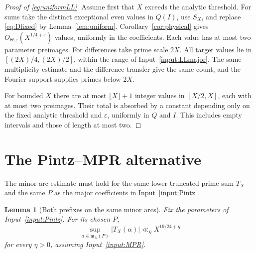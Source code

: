 \documentclass[11pt]{article}
\newtheorem{lemma}[theorem]{Lemma}
\theoremstyle{definition}
\theoremstyle{remark}
\numberwithin{equation}{section}
\newcommand{\eps}{\varepsilon}
\newcommand{\m}{\mathfrak m}
\begin{document}
\begin{proof}[Proof of \eqref{eq:uniformLL}]
Assume first that $X$ exceeds the analytic threshold. For sums take
the distinct exceptional even values in $Q(I)$, use $S_X$, and replace
\eqref{eq:Dfixed} by Lemma~\ref{lem:uniform}. Corollary~\ref{cor:physical}
gives $O_{\Theta,\eps}(X^{1/4+\eps})$ values, uniformly in the
coefficients. Each value has at most two parameter preimages.
For differences take prime scale $2X$. All target values lie in
$[(2X)/4,(2X)/2]$, within the range of Input~\ref{input:LLmajor}.
The same multiplicity estimate and the difference transfer give
the same count, and the Fourier support supplies primes below $2X$.

For bounded $X$ there are at most $\lfloor X\rfloor+1$ integer values
in $[X/2,X]$, each with at most two preimages. Their total is absorbed
by a constant depending only on the fixed analytic threshold and
$\eps$, uniformly in $Q$ and $I$. This includes empty intervals and
those of length at most two.
\end{proof}

\section{The Pintz--MPR alternative}\label{sec:fallbackproof}

The minor-arc estimate must hold for the same lower-truncated prime
sum $T_X$ and the same $P$ as the major coefficients in
Input~\ref{input:Pintz}.

\begin{lemma}[Both prefixes on the same minor arcs]\label{lem:compatible}
Fix the parameters of Input~\ref{input:Pintz}. For its chosen $P$,
\begin{equation}\label{eq:MPRminor}
               \sup_{\alpha\in\m_X(P)}|T_X(\alpha)|
                            \ll_\eta X^{19/24+\eta}
\end{equation}
for every $\eta>0$, assuming Input~\ref{input:MPR}.
\end{lemma}
\end{document}
